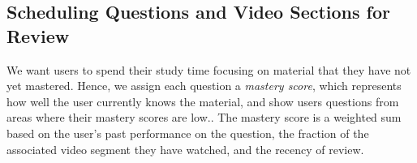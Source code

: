 \documentclass{chi-ext}
\begin{document}

\subsection{Scheduling Questions and Video Sections for Review}




We want users to spend their study time focusing on material that they have not yet mastered. Hence, we assign each question a \emph{mastery score}, which represents how well the user currently knows the material,  and show users questions from areas where their mastery scores are low.. The mastery score is a weighted sum based on the user's past performance on the question, the fraction of the associated video segment they have watched, and the recency of review.
\end{document}
